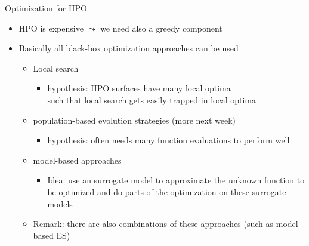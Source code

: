 \begin{frame}[c,fragile]{Optimization for HPO}

\begin{itemize}
	\item HPO is expensive $\leadsto$ we need also a greedy component
	\item Basically all black-box optimization approaches can be used
	\begin{itemize}
		\item Local search
		\begin{itemize}
			\item hypothesis: HPO surfaces have many local optima\\ such that local search gets easily trapped in local optima
		\end{itemize}
	 	\medskip
		\item population-based evolution strategies (more next week)
		\begin{itemize}
			\item hypothesis: often needs many function evaluations to perform well
		\end{itemize}
		\medskip
		\item model-based approaches
		\begin{itemize}
			\item Idea: use an surrogate model to approximate the unknown function to be optimized and do parts of the optimization on these surrogate models
		\end{itemize}
	    \item Remark: there are also combinations of these approaches (such as model-based ES)
	\end{itemize}
\end{itemize}

\end{frame}
